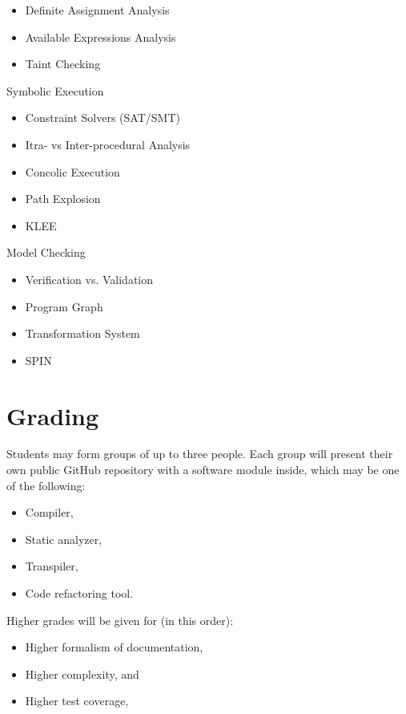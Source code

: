 \documentclass[nobrand,anonymous,nodate,nosecurity]{huawei}
\begin{document}
{\begin{lectures}
\begin{itemize}
	\item Definite Assignment Analysis
	\item Available Expressions Analysis
	\item Taint Checking
	\end{itemize}
\item Symbolic Execution
	\begin{itemize}
	\item Constraint Solvers (SAT/SMT)
	\item Itra- vs Inter-procedural Analysis
	\item Concolic Execution
	\item Path Explosion
	\item KLEE
	\end{itemize}
\item Model Checking
	\begin{itemize}
	\item Verification vs. Validation
	\item Program Graph
	\item Transformation System
	\item SPIN
	\end{itemize}
\end{lectures}

\newpage
\section*{Grading}

Students may form groups of up to three people. Each group will present
their own public GitHub repository with a software module inside, which
may be one of the following:

\begin{itemize}
	\item Compiler,
	\item Static analyzer,
	\item Transpiler,
	\item Code refactoring tool.
\end{itemize}

Higher grades will be given for (in this order):

\begin{itemize}
	\item Higher formalism of documentation,
	\item Higher complexity,
	and
	\item Higher test coverage,
\end{itemize}

}
\end{document}
